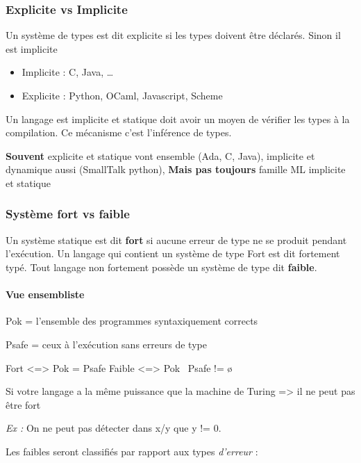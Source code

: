\documentclass[]{article}
\providecommand{\tightlist}{%
  \setlength{\itemsep}{0pt}\setlength{\parskip}{0pt}}
\let\oldparagraph\paragraph
\renewcommand{\paragraph}[1]{\oldparagraph{#1}\mbox{}}
\begin{document}
\subsubsection{Explicite vs Implicite}\label{explicite-vs-implicite}

Un système de types est dit explicite si les types doivent être
déclarés. Sinon il est implicite

\begin{itemize}
\tightlist
\item
  Implicite : C, Java, \ldots{}
\item
  Explicite : Python, OCaml, Javascript, Scheme
\end{itemize}

Un langage est implicite et statique doit avoir un moyen de vérifier les
types à la compilation. Ce mécanisme c'est l'inférence de types.

\textbf{Souvent} explicite et statique vont ensemble (Ada, C, Java),
implicite et dynamique aussi (SmallTalk python), \textbf{Mais pas
toujours} famille ML implicite et statique

\subsubsection{Système fort vs faible}\label{systuxe8me-fort-vs-faible}

Un système statique est dit \textbf{fort} si aucune erreur de type ne se
produit pendant l'exécution. Un langage qui contient un système de type
Fort est dit fortement typé. Tout langage non fortement possède un
système de type dit \textbf{faible}.

\paragraph{Vue ensembliste}\label{vue-ensembliste}

Pok = l'ensemble des programmes syntaxiquement corrects

Psafe = ceux à l'exécution sans erreurs de type

Fort \textless{}=\textgreater{} Pok = Psafe Faible
\textless{}=\textgreater{} Pok ~Psafe != ø

Si votre langage a la même puissance que la machine de Turing
=\textgreater{} il ne peut pas être fort

\emph{Ex :} On ne peut pas détecter dans x/y que y != 0.

Les faibles seront classifiés par rapport aux types \emph{d'erreur} :
\end{document}
